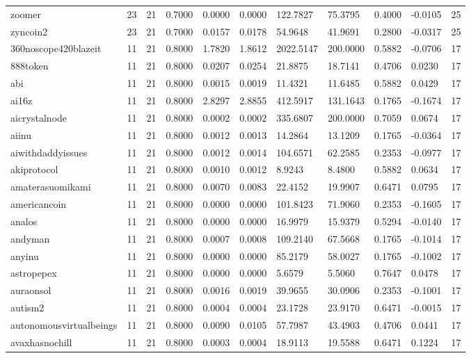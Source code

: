 \begin{table}[htbp]
\begin{tabular}{lllllllllll}
zoomer & 23 & 21 & 0.7000 & 0.0000 & 0.0000 & 122.7827 & 75.3795 & 0.4000 & -0.0105 & 25 \\
zyncoin2 & 23 & 21 & 0.7000 & 0.0157 & 0.0178 & 54.9648 & 41.9691 & 0.2800 & -0.0317 & 25 \\
360noscope420blazeit & 11 & 21 & 0.8000 & 1.7820 & 1.8612 & 2022.5147 & 200.0000 & 0.5882 & -0.0706 & 17 \\
888token & 11 & 21 & 0.8000 & 0.0207 & 0.0254 & 21.8875 & 18.7141 & 0.4706 & 0.0230 & 17 \\
abi & 11 & 21 & 0.8000 & 0.0015 & 0.0019 & 11.4321 & 11.6485 & 0.5882 & 0.0429 & 17 \\
ai16z & 11 & 21 & 0.8000 & 2.8297 & 2.8855 & 412.5917 & 131.1643 & 0.1765 & -0.1674 & 17 \\
aicrystalnode & 11 & 21 & 0.8000 & 0.0002 & 0.0002 & 335.6807 & 200.0000 & 0.7059 & 0.0674 & 17 \\
aiinu & 11 & 21 & 0.8000 & 0.0012 & 0.0013 & 14.2864 & 13.1209 & 0.1765 & -0.0364 & 17 \\
aiwithdaddyissues & 11 & 21 & 0.8000 & 0.0012 & 0.0014 & 104.6571 & 62.2585 & 0.2353 & -0.0977 & 17 \\
akiprotocol & 11 & 21 & 0.8000 & 0.0010 & 0.0012 & 8.9243 & 8.4800 & 0.5882 & 0.0634 & 17 \\
amaterasuomikami & 11 & 21 & 0.8000 & 0.0070 & 0.0083 & 22.4152 & 19.9907 & 0.6471 & 0.0795 & 17 \\
americancoin & 11 & 21 & 0.8000 & 0.0000 & 0.0000 & 101.8423 & 71.9060 & 0.2353 & -0.1605 & 17 \\
analos & 11 & 21 & 0.8000 & 0.0000 & 0.0000 & 16.9979 & 15.9379 & 0.5294 & -0.0140 & 17 \\
andyman & 11 & 21 & 0.8000 & 0.0007 & 0.0008 & 109.2140 & 67.5668 & 0.1765 & -0.1014 & 17 \\
anyinu & 11 & 21 & 0.8000 & 0.0000 & 0.0000 & 85.2179 & 58.0027 & 0.1765 & -0.1002 & 17 \\
astropepex & 11 & 21 & 0.8000 & 0.0000 & 0.0000 & 5.6579 & 5.5060 & 0.7647 & 0.0478 & 17 \\
auraonsol & 11 & 21 & 0.8000 & 0.0016 & 0.0019 & 39.9655 & 30.0906 & 0.2353 & -0.1001 & 17 \\
autism2 & 11 & 21 & 0.8000 & 0.0004 & 0.0004 & 23.1728 & 23.9170 & 0.6471 & -0.0015 & 17 \\
autonomousvirtualbeings & 11 & 21 & 0.8000 & 0.0090 & 0.0105 & 57.7987 & 43.4903 & 0.4706 & 0.0441 & 17 \\
avaxhasnochill & 11 & 21 & 0.8000 & 0.0003 & 0.0004 & 18.9113 & 19.5588 & 0.6471 & 0.1224 & 17 \\

\end{tabular}
\end{table}
